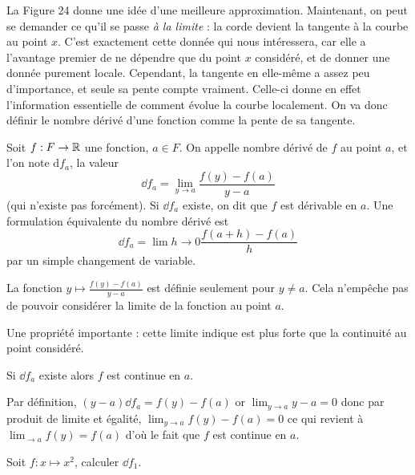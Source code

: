 
 La Figure 24 donne une idée d'une meilleure approximation. Maintenant, on peut se demander ce qu'il se passe \textit{à la limite} : la corde devient la tangente à la courbe au point $x$. C'est exactement cette donnée qui nous intéressera, car elle a l'avantage premier de ne dépendre que du point $x$ considéré, et de donner une donnée purement locale. Cependant, la tangente en elle-même a assez peu d'importance, et seule sa pente compte vraiment. Celle-ci donne en effet l'information essentielle de comment évolue la courbe localement. On va donc définir le nombre dérivé d'une fonction comme la pente de sa tangente.

 \begin{defi}
    Soit $f : F \to \mathbb{R}$ une fonction, $a\in F$. On appelle nombre dérivé de $f$ au point $a$, et l'on note $\mathrm{d}f_a$, la valeur $$\dd f_a = \lim_{y\to a}\frac{f(y)-f(a)}{y-a}$$ (qui n'existe pas forcément). Si $\dd f_a$ existe, on dit que $f$ est dérivable en $a$. Une formulation équivalente du nombre dérivé est $$\dd f_a = \lim{h\to 0}\frac{f(a+h)-f(a)}{h}$$ par un simple changement de variable.
 \end{defi}

 \begin{rmk}
    La fonction $y\mapsto \displaystyle{\frac{f(y)-f(a)}{y-a}}$ est définie seulement pour $y\neq a$. Cela n'empêche pas de pouvoir considérer la limite de la fonction au point $a$.
 \end{rmk}

 Une propriété importante : cette limite indique est plus forte que la continuité au point considéré.

 \begin{prop}
     Si $\dd f_a$ existe alors $f$ est continue en $a$.
 \end{prop}

 \begin{prop}
     Par définition, $(y-a)\dd f_a = f(y)-f(a)$ or $\displaystyle{\lim_{y\to a} y- a = 0}$ donc par produit de limite et égalité, $\displaystyle{\lim_{y\to a} f(y)-f(a) = 0}$ ce qui revient à $\displaystyle{\lim_{\to a} f(y) = f(a)}$ d'où le fait que $f$ est continue en $a$.
 \end{prop}

 \begin{exo}
    Soit $f : x \mapsto x^2$, calculer $\dd f_1$.
 \end{exo}

